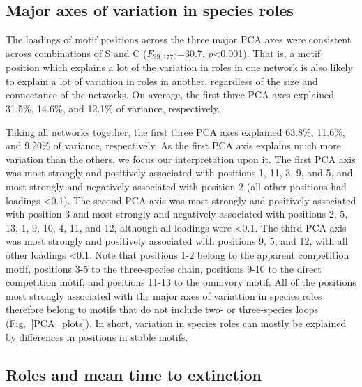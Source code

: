 \documentclass[12pt]{article}
\begin{document}
	\subsection*{Major axes of variation in species roles}

		The loadings of motif positions across the three major PCA axes were consistent across combinations of S and C ($F_{29,1770}$=30.7, $p$\textless0.001). That is, a motif position which explains a lot of the variation in roles in one network is also likely to explain a lot of variation in roles in another, regardless of the size and connectance of the networks. On average, the first three PCA axes explained 31.5\%, 14.6\%, and 12.1\% of variance, respectively. 
		

		Taking all networks together, the first three PCA axes explained  63.8\%, 11.6\%, and 9.20\% of variance, respectively. As the first PCA axis explains much more variation than the others, we focus our interpretation upon it.
		The first PCA axis was most strongly and positively associated with positions 1, 11, 3, 9, and 5, and most strongly and negatively associated with position 2 (all other positions had loadings \textless0.1). The second PCA axis was most strongly and positively associated with position 3 and most strongly and negatively associated with positions 2, 5, 13, 1, 9, 10, 4, 11, and 12, although all loadings were \textless0.1. The third PCA axis was most strongly and positively associated with positions 9, 5, and 12, with all other loadings \textless0.1. 
		Note that positions 1-2 belong to the apparent competition motif, positions 3-5 to the three-species chain, positions 9-10 to the direct competition motif, and positions 11-13 to the omnivory motif. All of the positions most strongly associated with the major axes of variattion in species roles therefore belong to motifs that do not include two- or three-species loops (Fig.~\ref{PCA_plots}). In short, variation in species roles can mostly be explained by differences in positions in stable motifs.



	\subsection*{Roles and mean time to extinction}
\end{document}
